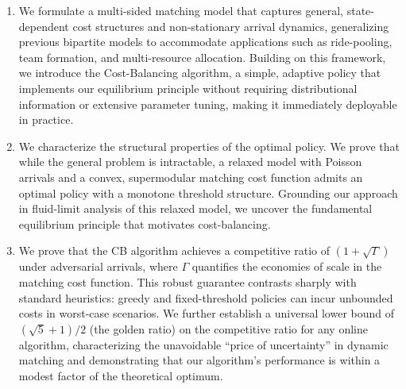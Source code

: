 \begin{enumerate}
    \item %
    We formulate a multi-sided matching model that captures general, state-dependent cost structures and non-stationary arrival dynamics, generalizing previous bipartite models to accommodate applications such as ride-pooling, team formation, and multi-resource allocation.
    Building on this framework, we introduce the Cost-Balancing algorithm, a simple, adaptive policy that implements our equilibrium principle without requiring distributional information or extensive parameter tuning, making it immediately deployable in practice.

    \item %
    We characterize the structural properties of the optimal policy.
    We prove that while the general problem is intractable, a relaxed model with Poisson arrivals and a convex, supermodular matching cost function admits an optimal policy with a monotone threshold structure.
    Grounding our approach in fluid-limit analysis of this relaxed model, we uncover the fundamental equilibrium principle that motivates cost-balancing.

    \item %
    We prove that the CB algorithm achieves a competitive ratio of $(1+\sqrt{\Gamma})$ under adversarial arrivals, where $\Gamma$ quantifies the economies of scale in the matching cost function.
    This robust guarantee contrasts sharply with standard heuristics: greedy and fixed-threshold policies can incur unbounded costs in worst-case scenarios.
    We further establish a universal lower bound of $(\sqrt{5}+1)/2$ (the golden ratio) on the competitive ratio for any online algorithm, characterizing the unavoidable ``price of uncertainty'' in dynamic matching and demonstrating that our algorithm's performance is within a modest factor of the theoretical optimum.


\end{enumerate}
